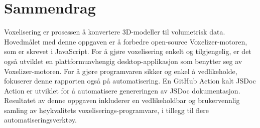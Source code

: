 \section*{Sammendrag}
Voxelisering er prosessen å konvertere 3D-modeller til volumetrisk data. Hovedmålet med denne oppgaven er å forbedre open-source Voxelizer-motoren, som er skrevet i JavaScript. For å gjøre voxelisering enkelt og tilgjengelig, er det også utviklet en plattformuavhengig desktop-applikasjon som benytter seg av Voxelizer-motoren. For å gjøre programvaren sikker og enkel å vedlikeholde, fokuserer denne rapporten også på automatisering. En GitHub Action kalt JSDoc Action er utviklet for å automatisere genereringen av JSDoc dokumentasjon. Resultatet av denne oppgaven inkluderer en vedlikeholdbar og brukervennlig samling av høykvalitets voxeliserings-programvare, i tillegg til flere automatiseringsverktøy.

